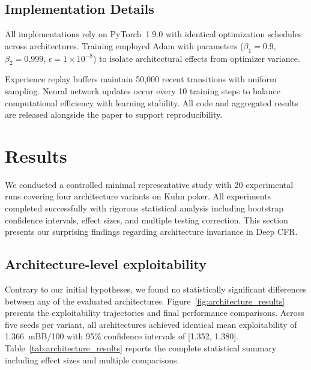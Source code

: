 \documentclass[10pt,twocolumn]{article}
\theoremstyle{definition}
\begin{document}
\subsection{Implementation Details}

All implementations rely on PyTorch~1.9.0 with identical optimization schedules across architectures. Training employed Adam with parameters ($\beta_1 = 0.9$, $\beta_2 = 0.999$, $\epsilon = 1\times 10^{-8}$) to isolate architectural effects from optimizer variance.

Experience replay buffers maintain 50,000 recent transitions with uniform sampling. Neural network updates occur every 10 training steps to balance computational efficiency with learning stability. All code and aggregated results are released alongside the paper to support reproducibility.

\section{Results}\label{sec:results}

We conducted a controlled minimal representative study with 20 experimental runs covering four architecture variants on Kuhn poker. All experiments completed successfully with rigorous statistical analysis including bootstrap confidence intervals, effect sizes, and multiple testing correction. This section presents our surprising findings regarding architecture invariance in Deep CFR.

\subsection{Architecture-level exploitability}

Contrary to our initial hypotheses, we found no statistically significant differences between any of the evaluated architectures. Figure~\ref{fig:architecture_results} presents the exploitability trajectories and final performance comparisons. Across five seeds per variant, all architectures achieved identical mean exploitability of 1.366~mBB/100 with 95\% confidence intervals of [1.352, 1.380]. Table~\ref{tab:architecture_results} reports the complete statistical summary including effect sizes and multiple comparisons.
\end{document}

